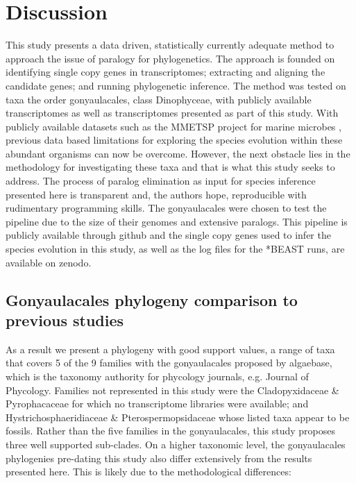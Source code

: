 \documentclass[12pt]{article}
\begin{document}
\section{Discussion}
This study presents a data driven, statistically currently adequate method to approach the issue of paralogy for phylogenetics. 
The approach is founded on identifying single copy genes in transcriptomes; extracting and aligning the candidate genes; and running phylogenetic inference. 
The method was tested on taxa the order gonyaulacales, class Dinophyceae, with publicly available transcriptomes as well as transcriptomes presented as part of this study. 
With publicly available datasets such as the MMETSP project for marine microbes \cite{keeling2014marine}, previous data based limitations for exploring the species evolution within these abundant organisms can now be overcome. 
However, the next obstacle lies in the methodology for investigating these taxa and that is what this study seeks to address. 
The process of paralog elimination as input for species inference presented here is transparent and, the authors hope, reproducible with rudimentary programming skills. 
The gonyaulacales were chosen to test the pipeline due to the size of their genomes and extensive paralogs.
This pipeline is publicly available through github and the single copy genes used to infer the species evolution in this study, as well as the log files for the *BEAST runs, are available on zenodo.
 
\subsection*{Gonyaulacales phylogeny comparison to previous studies} 
As a result we present a phylogeny with good support values, a range of taxa that covers 5 of the 9 families with the gonyaulacales proposed by algaebase, which is the taxonomy authority for phycology journals, e.g. Journal of Phycology. 
Families not represented in this study were the Cladopyxidaceae \& Pyrophacaceae for which no transcriptome libraries were available; and Hystrichosphaeridiaceae \& Pterospermopsidaceae whose listed taxa appear to be fossils.
Rather than the five families in the gonyaulacales, this study proposes three well supported sub-clades. 
On a higher taxonomic level, the gonyaulacales phylogenies pre-dating this study also differ extensively from the results presented here. 
This is likely due to the methodological differences: 
\end{document}
